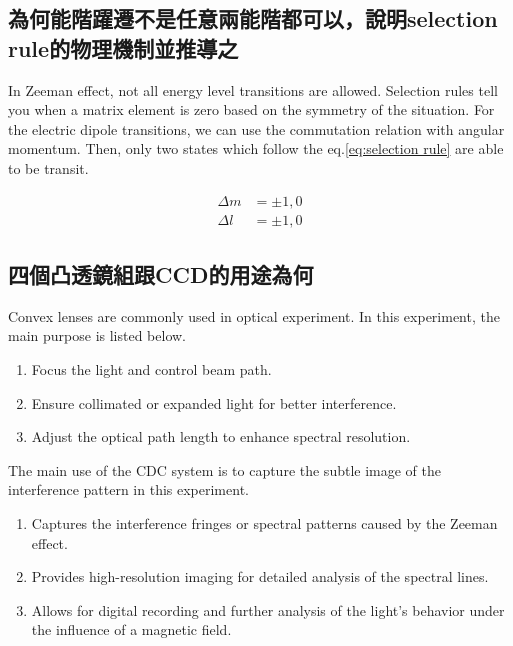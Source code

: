 \documentclass[a4paper,12pt]{article}
\begin{document}
    
    \subsection{為何能階躍遷不是任意兩能階都可以，說明selection rule的物理機制並推導之}
    \par In Zeeman effect, not all energy level transitions are allowed. Selection rules tell you when a matrix element is zero based on the symmetry of the situation. For the electric dipole transitions, we can use the commutation relation with angular momentum. Then, only two states which follow the eq.\ref{eq:selection rule} are able to be transit.
    
    \begin{align}
        \Delta m &= \pm 1, 0 \\
        \Delta l &= \pm 1, 0
    \label{eq:selection rule}
    \end{align}
    
    
    
    \subsection{四個凸透鏡組跟CCD的用途為何}
    
    \par Convex lenses are commonly used in optical experiment. In this experiment, the main purpose is listed below.
    \begin{enumerate}
        \item Focus the light and control beam path.
    
        \item Ensure collimated or expanded light for better interference.
    
        \item Adjust the optical path length to enhance spectral resolution.
    \end{enumerate}
    
    \par The main use of the CDC system is to capture the subtle image of the interference pattern in this experiment.  
    
    \begin{enumerate}
        \item Captures the interference fringes or spectral patterns caused by the Zeeman effect.
    
        \item Provides high-resolution imaging for detailed analysis of the spectral lines.
    
        \item Allows for digital recording and further analysis of the light's behavior under the influence of a magnetic field.
    \end{enumerate}
    
\end{document}
